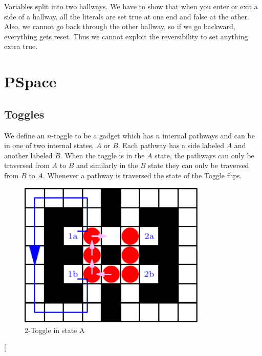 \documentclass[11pt]{article}
\makeatletter
\gdef\xxx{\@ifnextchar[\xxx@lab\xxx@nolab}
\makeatother
\begin{document}
Variables split into two hallways. We have to show that when you enter or exit a side of a hallway, all the literals are set true at one end and false at the other. Also, we cannot go back through the other hallway, so if we go backward, everything gets reset. Thus we cannot exploit the reversibility to set anything extra true.


\section{PSpace}

\subsection{Toggles}
We define an $n$-toggle to be a gadget which has $n$ internal pathways and can be in one of two internal states, $A$ or $B$. Each pathway has a side labeled $A$ and another labeled $B$. When the toggle is in the $A$ state, the pathways can only be traversed from $A$ to $B$ and similarly in the $B$ state they can only be traversed from $B$ to $A$. Whenever a pathway is traversed the state of the Toggle flips.

\begin{figure}[!ht]
  \centering
    \includegraphics[width=0.8\textwidth]{2-toggleA}
    \caption{2-Toggle in state A}
    \label{2toggleA}
\end{figure}

\xxx{broken toggle}
\end{document}
